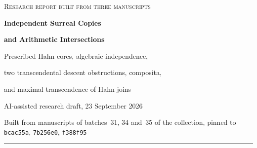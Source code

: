 \documentclass[11pt,letterpaper]{article}
\theoremstyle{definition}
\theoremstyle{remark}
\newcommand{\No}{\mathbf{No}}
\newcommand{\R}{\mathbb R}
\newcommand{\K}[2]{\mathcal K_{#1}(#2)}
\numberwithin{equation}{section}
\begin{document}
\hypersetup{pageanchor=false}
\begin{titlepage}
\thispagestyle{empty}
\vspace*{0.05in}
{\large\scshape Research report built from three manuscripts\par}
\vspace{0.1in}
{\Huge\bfseries Independent Surreal Copies\par}
\vspace{0.12in}
{\Huge\bfseries and Arithmetic Intersections\par}
\vspace{0.16in}
{\Large Prescribed Hahn cores, algebraic independence,\par
two transcendental descent obstructions, composita,\par
and maximal transcendence of Hahn joins\par}
\vspace{0.12in}
{\large AI-assisted research draft, 23 September 2026\par}
\vspace{0.04in}
{\small Built from manuscripts of batches~31, 34 and~35 of the collection,
pinned to \texttt{bcac55a}, \texttt{7b256e0}, \texttt{f388f95}\par}
\vspace{0.1in}
\hrule
\vspace{0.1in}
\begin{abstract}
Let $H$ be any set-sized divisible additive subgroup of the surreal numbers,
and let $L=\K{\R}{H}$ be the full Conway--Hahn field with exponents in $H$.
We construct an ordinal-indexed proper class of strong, real-fixing,
monomial-preserving self-embeddings of $\No$ whose images are jointly
linearly disjoint over $L$ and have pairwise intersection exactly $L$.
All embeddings fix $L$ pointwise and preserve and reflect the omnific
integers. The same construction gives complex-fixing, conjugation-compatible
copies of $\No(i)$ and its Gaussian omnific ring. Every set of parameters
can be fixed by choosing a suitable $H$.


\end{abstract}
\end{titlepage}
\end{document}
